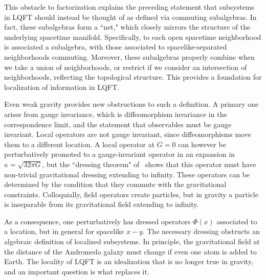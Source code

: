This obstacle to factorization explains the preceding statement that subsystems in LQFT should instead be thought of as defined via commuting subalgebras.  In fact, these subalgebras form a ``net," which closely mirrors the structure of the underlying spacetime manifold\Haag.  Specifically, to each open spacetime neighborhood is associated a subalgebra, with those associated to spacelike-separated neighborhoods commuting.  Moreover, these subalgebras properly combine when we take a union of neighborhoods, or restrict if we consider an intersection of neighborhoods, reflecting the topological structure.  This provides a foundation for localization of information in LQFT.

Even weak gravity provides new obstructions to such a definition.  A primary one arises from gauge invariance, which is diffeomorphism invariance in the correspondence limit, and the statement that observables must be gauge invariant.  Local operators are not gauge invariant, since diffeomorphisms move them to a different location.  A local operator at $G=0$ can however be perturbatively promoted to a gauge-invariant operator\DoGione{} in an expansion in $\kappa=\sqrt{32\pi G}$, but the ``dressing theorem" of \DoGitwo\ shows that this operator must have non-trivial gravitational dressing extending to infinity.  These operators can be determined by the condition that they commute with the gravitational constraints.  Colloquially, field operators create particles, but in gravity a particle is inseparable from its gravitational field extending to infinity.

As a consequence, one perturbatively has dressed operators $\Phi(x)$ associated to a location, but in general
%
\eqn{}
%
for spacelike $x-y$.  The necessary dressing obstructs an algebraic definition of localized subsystems.  In principle, the gravitational field at the distance of the Andromeda galaxy must change if even one atom is added to Earth.  The locality of LQFT is an idealization that is no longer true in gravity, and an important question is what replaces it.

